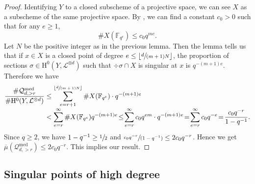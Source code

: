 \documentclass[11pt]{article}
\newcommand{\Subsection}{\subsection}
\numberwithin{equation}{section}
\newcommand{\spfrac}[2]{\sfrac{#1}{(#2)}}
\theoremstyle{plain}
\theoremstyle{definition}
\newcommand{\ho}{\mathrm{H}}
\newcommand{\li}{\mathcal{L}}
\newcommand{\F}{\mathbb{F}}
\begin{document}
\begin{proof}
Identifying $Y$ to a closed subscheme of a projective space, we can see $X$ as a subscheme of the same projective space. By \cite{LW54}, we can find a constant $c_0>0$ such that for any $e\geq 1$,\vspace*{-3pt}
\[
\#X(\F_{q^e})\leq c_0 q^{me}.
\]
Let $N$ be the positive integer as in the previous lemma. Then the lemma tells us that if $x\in X$ is a closed point of degree $e\leq \lfloor \sfrac{d}{(m+1)N}\rfloor$, the proportion of sections $\sigma\in \ho^0(Y, \li^{\otimes d})$ such that $\div \sigma\cap X$ is singular at $x$ is $q^{-(m+1)e}$. Therefore we have\vspace*{-3pt}
\begin{align*}
\frac{\#\mathcal{Q}_{d, >r}^{\mathrm{med}}}{\# \ho^0(Y, \mathcal{L}^{\otimes d})}
&\leq \sum_{e=r+1}^{\lfloor\sfrac{d}{(m+1)N}\rfloor}\#X(\mathbb{F}_{q^e})\cdot q^{-(m+1)e} \\[-3pt]
&< \sum_{e=r}^{\infty}\#X(\mathbb{F}_{q^e})q^{-(m+1)e} \!\leq\! \sum_{e=r}^{\infty}c_0q^{em}\cdot q^{-(m+1)e}\!=\!\sum_{e=r}^{\infty}c_0q^{-e}\!=\!\frac{c_0q^{-r}}{1-q^{-1}}.
\end{align*}
Since $q\geq 2$, we have $1-q^{-1}\geq \sfrac{1}{2}$ and $\spfrac{c_0q^{-r}}{1-q^{-1}}\leq 2c_0q^{-r}$. Hence we get $\overline{\mu}(\mathcal{Q}_{d, >r}^{\mathrm{med}})\leq 2c_0q^{-r}$. This implies our result.
\end{proof}

\Subsection{Singular points of high degree}
\end{document}
